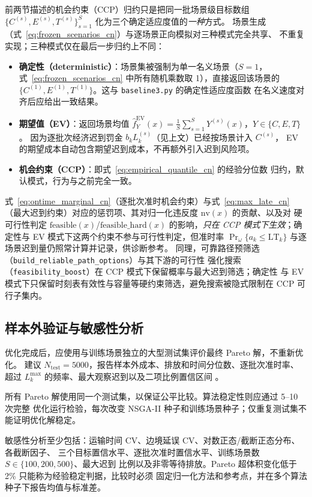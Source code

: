 前两节描述的机会约束（CCP）归约只是把同一批场景级目标数组
$\{C^{(s)},E^{(s)},T^{(s)}\}_{s=1}^S$ 化为三个确定适应度值的\emph{一种}方式。
场景生成（式~\eqref{eq:frozen_scenarios_cn}）与逐场景正向模拟对三种模式完全共享、
不重复实现；三种模式仅在最后一步归约上不同：
\begin{itemize}
  \item \textbf{确定性（deterministic）}：场景集被强制为单一名义场景（$S=1$，
    式~\eqref{eq:frozen_scenarios_cn} 中所有随机乘数取 1），直接返回该场景的
    $\{C^{(1)},E^{(1)},T^{(1)}\}$。这与 \texttt{baseline3.py} 的确定性适应度函数
    在名义速度对齐后应给出一致结果。
  \item \textbf{期望值（EV）}：返回场景均值
    $\hat f_Y^{\mathrm{EV}}(x)=\tfrac1S\sum_{s=1}^S Y^{(s)}(x)$，$Y\in\{C,E,T\}$。
    因为逐批次经济迟到罚金 $b_k L_k^{(s)}$（见上文）已经按场景计入 $C^{(s)}$，
    EV 的期望成本自动包含期望迟到成本，不再额外引入迟到风险项。
  \item \textbf{机会约束（CCP）}：即式~\eqref{eq:empirical_quantile_cn} 的经验分位数
    归约，默认模式，行为与之前完全一致。
\end{itemize}
式~\eqref{eq:ontime_marginal_cn}（逐批次准时机会约束）与式~\eqref{eq:max_late_cn}
（最大迟到约束）对应的惩罚项、其对归一化违反度 $\mathrm{nv}(x)$ 的贡献、以及对
硬可行性判定 $\mathrm{feasible}(x)$/$\mathrm{feasible\_hard}(x)$ 的影响，\emph{只在
CCP 模式下生效}；确定性与 EV 模式下这两个约束不参与可行性判定，但准时率
$\Pr_\omega\{a_k\le\mathrm{LT}_k\}$ 与逐场景迟到量仍照常计算并记录，供诊断参考。
同理，可靠路径预筛选（\texttt{build\_reliable\_path\_options}）与其下游的可行性
强化搜索（\texttt{feasibility\_boost}）在 CCP 模式下保留概率与最大迟到筛选；确定性
与 EV 模式下只保留时刻表有效性与容量等硬约束筛选，避免搜索被隐式限制在 CCP 可行子集内。

\subsection{样本外验证与敏感性分析}

优化完成后，应使用与训练场景独立的大型测试集评价最终 Pareto 解，不重新优化。
建议 $N_{\mathrm{test}}=5000$，报告样本外成本、排放和时间分位数、逐批次准时率、
超过 $L_k^{\max}$ 的频率、最大观察迟到以及二项比例置信区间
\citep{LuedtkeAhmed2008}。

所有 Pareto 解使用同一个测试集，以保证公平比较。算法稳定性则应通过 5--10 次完整
优化运行检验，每次改变 NSGA-II 种子和训练场景种子；仅重复测试集不能证明优化解稳定。

敏感性分析至少包括：运输时间 CV、边境延误 CV、对数正态/截断正态分布、各截断因子、
三个目标置信水平、逐批次准时置信水平、训练场景数 $S\in\{100,200,500\}$、最大迟到
比例以及非零等待排放。Pareto 超体积变化低于 2\% 只能称为经验稳定判据，比较时必须
固定归一化方法和参考点，并在多个算法种子下报告均值与标准差。

